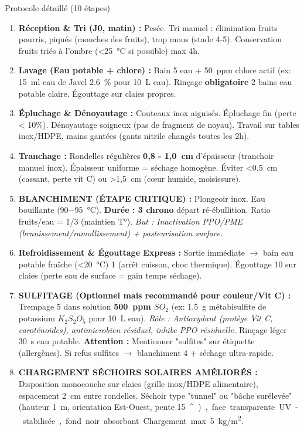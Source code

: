 \documentclass[11pt]{article}
\providecommand{\degree}{^{\circ}}
\begin{document}
\begin{exoresolu}
\begin{methode}{Protocole détaillé (10 étapes)}
\begin{enumerate}
    \item \textbf{Réception \& Tri (J0, matin) :} Pesée. Tri manuel : élimination fruits pourris, piqués (mouches des fruits), trop mous (stade 4-5). Conservation fruits triés à l'ombre (\SI{<25}{\celsius} si possible) max 4h.
    \item \textbf{Lavage (Eau potable + chlore) :} Bain \SI{5}{\min} eau + \SI{50}{ppm} chlore actif (ex: \SI{15}{ml} eau de Javel \SI{2,6}{\%} pour \SI{10}{L} eau). Rinçage \textbf{obligatoire} 2 bains eau potable claire. Égouttage sur claies propres.
    \item \textbf{Épluchage \& Dénoyautage :} Couteaux inox aiguisés. Épluchage fin (perte < 10\%). Dénoyautage soigneux (pas de fragment de noyau). Travail sur tables inox/HDPE, mains gantées (gants nitrile changés toutes les 2h).
    \item \textbf{Tranchage :} Rondelles régulières \textbf{\SI{0,8 - 1,0}{cm}} d'épaisseur (tranchoir manuel inox). Épaisseur uniforme = séchage homogène. Éviter \SI{<0,5}{cm} (cassant, perte vit C) ou \SI{>1,5}{cm} (cœur humide, moisissure).
    \item \textbf{BLANCHIMENT (ÉTAPE CRITIQUE) :} Plongeoir inox. Eau bouillante (\SI{90-95}{\celsius}). \textbf{Durée : \SI{3}{\min} chrono} départ ré-ébullition. Ratio fruits/eau = 1/3 (maintien T°). \textit{But : Inactivation PPO/PME (brunissement/ramollissement) + pasteurisation surface.}
    \item \textbf{Refroidissement \& Égouttage Express :} Sortie immédiate $\rightarrow$ bain eau potable fraîche (\SI{<20}{\celsius}) \SI{1}{\min} (arrêt cuisson, choc thermique). Égouttage \SI{10}{\min} sur claies (perte eau de surface = gain temps séchage).
    \item \textbf{SULFITAGE (Optionnel mais recommandé pour couleur/Vit C) :} Trempage \SI{5}{\min} dans solution \textbf{\SI{500}{ppm} $SO_2$} (ex: \SI{1,5}{g} métabisulfite de potassium $K_2S_2O_5$ pour \SI{10}{L} eau). \textit{Rôle : Antioxydant (protège Vit C, caroténoïdes), antimicrobien résiduel, inhibe PPO résiduelle.} Rinçage léger \SI{30}{s} eau potable. \textbf{Attention :} Mentionner "sulfites" sur étiquette (allergènes). Si refus sulfites $\rightarrow$ blanchiment \SI{4}{\min} + séchage ultra-rapide.
    \item \textbf{CHARGEMENT SÉCHOIRS SOLAIRES AMÉLIORÉS :} Disposition monocouche sur claies (grille inox/HDPE alimentaire), espacement \SI{2}{cm} entre rondelles. Séchoir type "tunnel" ou "bâche surélevée" (hauteur \SI{1}{m}, orientation Est-Ouest, pente \SI{15}{\degree}), face transparente UV-stabilisée, fond noir absorbant. Chargement max \SI{5}{kg/m^2}.

\end{enumerate}
\end{methode}
\end{exoresolu}
\end{document}
